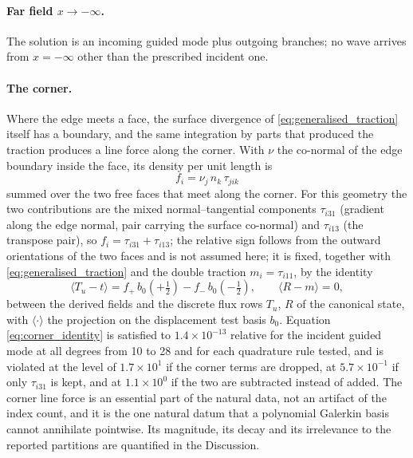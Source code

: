 \paragraph{Far field $x\to-\infty$.}  The solution is an incoming guided mode
plus outgoing branches; no wave arrives from $x=-\infty$ other than the
prescribed incident one.

\paragraph{The corner.}  Where the edge meets a face, the surface divergence of
\eqref{eq:generalised_traction} itself has a boundary, and the same integration by
parts that produced the traction produces a line force along the corner.  With
$\nu$ the co-normal of the edge boundary inside the face, its density per unit
length is
\begin{equation}
\label{eq:corner_force}
f_i=\nu_j\,n_k\,\tau_{jik}
\end{equation}
summed over the two free faces that meet along the corner.  For this geometry the
two contributions are the mixed normal--tangential components $\tau_{i31}$
(gradient along the edge normal, pair carrying the surface co-normal) and
$\tau_{i13}$ (the transpose pair), so
$f_i=\tau_{i31}+\tau_{i13}$; the relative sign follows from the outward
orientations of the two faces and is not assumed here; it is fixed, together
with \eqref{eq:generalised_traction} and the double traction $m_i=\tau_{i11}$, by
the identity
\begin{equation}
\label{eq:corner_identity}
\bigl\langle T_{\!u}-t\bigr\rangle
=f_+\,b_0(+\tfrac12)-f_-\,b_0(-\tfrac12),
\qquad
\bigl\langle R-m\bigr\rangle=0 ,
\end{equation}
between the derived fields and the discrete flux rows $T_{\!u}$, $R$ of the
canonical state, with $\langle\cdot\rangle$ the projection on the displacement
test basis $b_0$.  Equation \eqref{eq:corner_identity} is satisfied to
$1.4\times10^{-13}$ relative for the incident guided mode at all degrees from 10 to 28 and for each quadrature rule tested, and is violated at the level of
$1.7\times10^{1}$ if the corner terms are dropped, at $5.7\times10^{-1}$ if only
$\tau_{i31}$ is kept, and at $1.1\times10^{0}$ if the two are subtracted instead
of added.  The corner line force is an essential part of the natural data, not an artifact of the index count, and it is the one natural datum that a
polynomial Galerkin basis cannot annihilate pointwise.  Its magnitude, its decay
and its irrelevance to the reported partitions are quantified in the Discussion.


